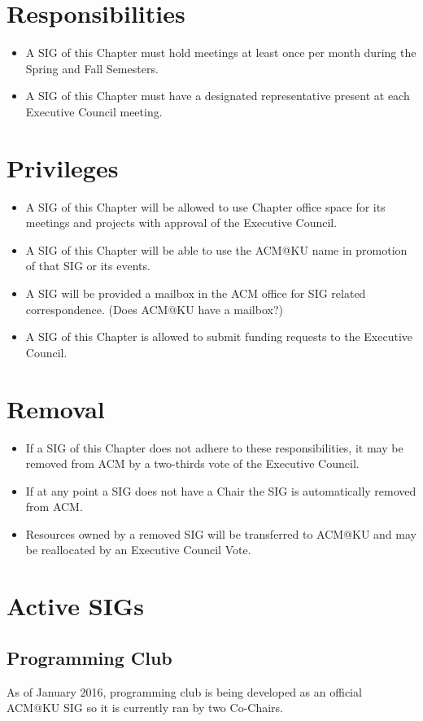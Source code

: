 \section{Responsibilities}
\begin{itemize}
  \item A SIG of this Chapter must hold meetings at least once per month during
        the Spring and Fall Semesters.
  \item A SIG of this Chapter must have a designated representative present at
        each Executive Council meeting.
\end{itemize}
\section{Privileges}
\begin{itemize}
  \item A SIG of this Chapter will be allowed to use Chapter office space for
        its meetings and projects with approval of the Executive Council.
  \item A SIG of this Chapter will be able to use the ACM@KU name in promotion
        of that SIG or its events.
  \item A SIG will be provided a mailbox in the ACM office for SIG related
        correspondence.
        (Does ACM@KU have a mailbox?)
  \item A SIG of this Chapter is allowed to submit funding requests to the
        Executive Council.
\end{itemize}
\section{Removal}
\begin{itemize}
  \item If a SIG of this Chapter does not adhere to these responsibilities, it
        may be removed from ACM by a two-thirds vote of the Executive Council.
  \item If at any point a SIG does not have a Chair the SIG is automatically
        removed from ACM.
  \item Resources owned by a removed SIG will be transferred to ACM@KU and may
        be reallocated by an Executive Council Vote.
\end{itemize}


\section{Active SIGs}

\subsection{Programming Club}
As of January 2016, programming club is being developed as an official ACM@KU
SIG so it is currently ran by two Co-Chairs.

